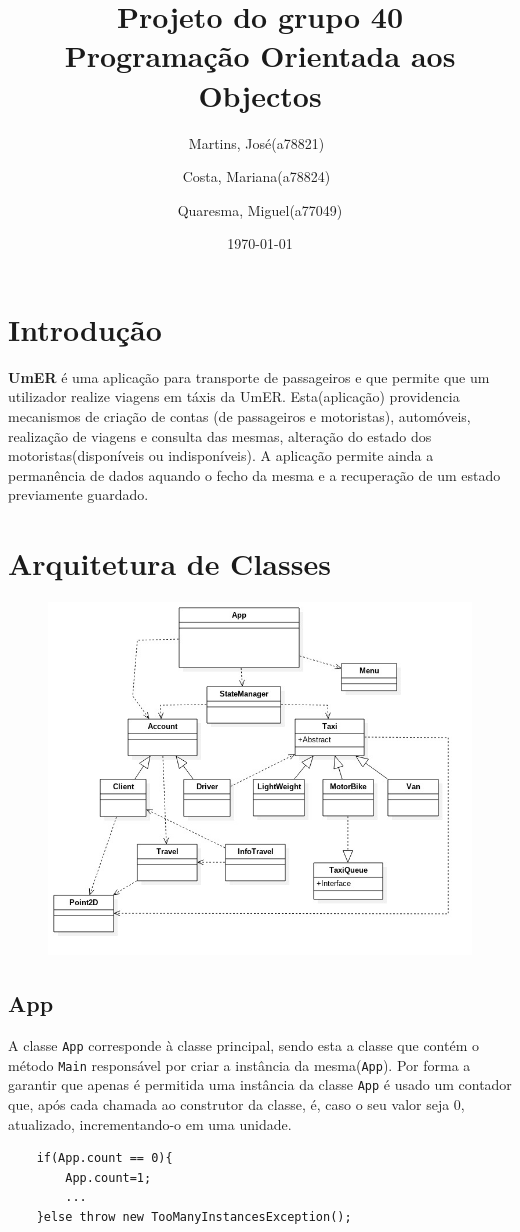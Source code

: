 \documentclass[a4paper,10pt,portuguese]{article}
\title{Projeto do grupo 40 \\ Programação Orientada aos Objectos}
\author{Martins, José(a78821)\
        \and
        Costa, Mariana(a78824)\
        \and
        Quaresma, Miguel(a77049)
        }
\date{\today}
\begin{document}
 
\begin{titlepage}
\maketitle
\end{titlepage}
 
\tableofcontents
\newpage

\section{Introdução}
\textbf{UmER} é uma aplicação para transporte de passageiros e que permite que um utilizador realize viagens em táxis da UmER. Esta(aplicação) providencia mecanismos de criação de contas (de passageiros e motoristas), automóveis, realização de viagens e consulta das mesmas, alteração do estado dos motoristas(disponíveis ou indisponíveis). A aplicação permite ainda a permanência de dados aquando o fecho da mesma e a recuperação de um estado previamente guardado.
\newapge

\section{Arquitetura de Classes}

\begin{figure}[ht!]
    \centering
    \includegraphics[width=120mm]{graph.jpg}
\end{figure}

\subsection{App}
A classe \texttt{App} corresponde à classe principal, sendo esta a classe que contém o método \texttt{Main} responsável por criar a instância da mesma(\texttt{App}).
Por forma a garantir que apenas é permitida uma instância da classe \texttt{App} é usado um contador que, após cada chamada ao construtor da classe, é, caso o seu valor seja 0, atualizado, incrementando-o em uma unidade. 
\begin{verbatim}
	if(App.count == 0){ 
        App.count=1;
        ...
    }else throw new TooManyInstancesException();
\end{verbatim}
\end{document}
